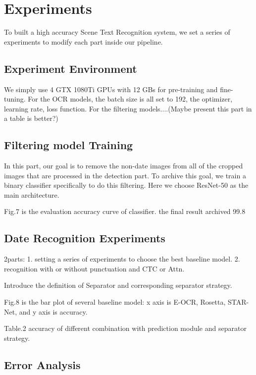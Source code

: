 \documentclass{article}
\begin{document}
\section{Experiments}

To built a high accuracy Scene Text Recognition system, we set a series of experiments to modify each part inside our pipeline. 

\subsection{Experiment Environment}

We simply use 4 GTX 1080Ti GPUs with 12 GBs for pre-training and fine-tuning. For the OCR models, the batch size is all set to 192, the optimizer, learning rate, loss function. For the filtering models....(Maybe present this part in a table is better?)

\subsection{Filtering model Training}

In this part, our goal is to remove the non-date images from all of the cropped images that are processed in the detection part. To archive this goal, we train a binary classifier specifically to do this filtering. Here we choose ResNet-50 as the main architecture. 

Fig.7 is the evaluation accuracy curve of classifier. the final result archived 99.8%

\subsection{Date Recognition Experiments}

2parts: 1. setting a series of experiments to choose the best baseline model.
2. recognition with or without punctuation and CTC or Attn.\par

Introduce the definition of Separator and corresponding separator strategy.\par

Fig.8 is the bar plot of several baseline model: x axis is E-OCR, Rosetta, STAR-Net, and y axis is accuracy.\par

Table.2 accuracy of different combination with prediction module and separator strategy.

\subsection{Error Analysis}
\end{document}
